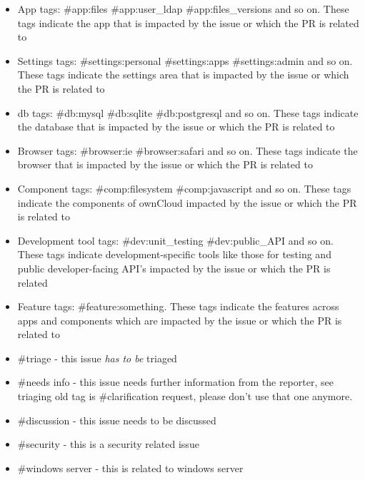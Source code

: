 \documentclass[letterpaper,10pt,english]{sphinxmanual}
\begin{document}
\begin{itemize}
\item {} 
App tags: \#app:files \#app:user\_ldap \#app:files\_versions and so on. These tags indicate the app that is impacted by the issue or which the PR is related to

\item {} 
Settings tags: \#settings:personal \#settings:apps \#settings:admin and so on. These tags indicate the settings area that is impacted by the issue or which the PR is related to

\item {} 
db tags: \#db:mysql \#db:sqlite \#db:postgresql and so on. These tags indicate the database that is impacted by the issue or which the PR is related to

\item {} 
Browser tags: \#browser:ie \#browser:safari and so on. These tags indicate the browser that is impacted by the issue or which the PR is related to

\item {} 
Component tags: \#comp:filesystem \#comp:javascript and so on. These tags indicate the components of ownCloud impacted by the issue or which the PR is related to

\item {} 
Development tool tags: \#dev:unit\_testing \#dev:public\_API and so on. These tags indicate development-specific tools like those for testing and public developer-facing API's impacted by the issue or which the PR is related

\item {} 
Feature tags: \#feature:something. These tags indicate the features across apps and components which are impacted by the issue or which the PR is related to

\item {} 
\#triage - this issue \emph{has to be} triaged

\item {} 
\#needs info - this issue needs further information from the reporter, see triaging old tag is \#clarification request, please don't use that one anymore.

\item {} 
\#discussion - this issue needs to be discussed

\item {} 
\#security - this is a security related issue

\item {} 
\#windows server - this is related to windows server


\end{itemize}
\end{document}
